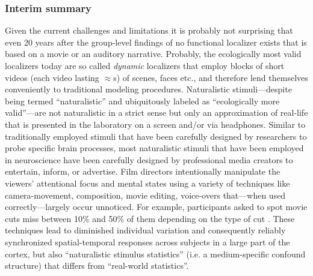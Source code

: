 \pagebreak

\subsubsection{Interim summary}


%
Given the current challenges and limitations it is probably not surprising that
even 20 years after the group-level findings of \citet{bartels2004mapping} no
functional localizer exists that is based on a movie or an auditory narrative.
%
Probably, the ecologically most valid localizers today are so called
\textit{dynamic} localizers \citep[e.g.,][]{pitcher2011differential,
fox2009defining} that employ blocks of short videos (each video lasting
$\approx$\unit[2-3]{s}) of scenes, faces etc., and therefore lend themselves
conveniently to traditional modeling procedures.
%
Naturalistic stimuli---despite being termed ``naturalistic'' and ubiquitously
labeled as ``ecologically more valid''---are not naturalistic in a strict sense
but only an approximation of real-life that is presented in the laboratory on a
screen and/or via headphones.
%
Similar to traditionally employed stimuli that have been carefully designed by
researchers to probe specific brain processes, most naturalistic stimuli that
have been employed in neuroscience have been carefully designed by professional
media creators to entertain, inform, or advertise.
%
Film directors intentionally manipulate the viewers' attentional focus and
mental states using a variety of techniques like camera-movement, composition,
movie editing, voice-overs \citep{brown2012cinematography,
dancyger2011film-technique, katz1991film, mercado2011filmmakers} that---when
used correctly---largely occur unnoticed.
%
For example, participants asked to spot movie cuts miss between 10\% and 50\% of
them depending on the type of cut \citep{smith2008edit}.
%
These techniques lead to diminished individual variation and consequently
reliably synchronized spatial-temporal responses across subjects
\citep{hasson2008neurocinematics} in a large part of the cortex, but also
``naturalistic stimulus statistics'' (i.e. a medium-specific confound structure)
that differs from ``real-world statistics''.

